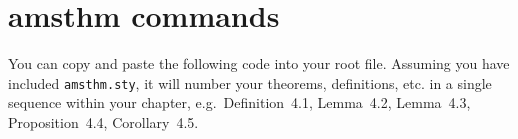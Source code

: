 
\chapter{amsthm commands}
\label{theorem}

You can copy and paste the following code into your root file.
Assuming you have included \verb"amsthm.sty", it will number your theorems,
definitions, etc. in a single sequence within your chapter,
e.g.~Definition~4.1, Lemma~4.2, Lemma~4.3, Proposition~4.4, Corollary~4.5.

\begin{smallverbatim} %
  \theoremstyle{plain}%
    \newtheorem{theorem}{Theorem}[chapter]
    \newtheorem{lemma}[theorem]{Lemma}
    \newtheorem{proposition}[theorem]{Proposition}
    \newtheorem{corollary}[theorem]{Corollary}
    \newtheorem{conjecture}[theorem]{Conjecture}

    \newtheorem*{theorem*}{Theorem}
    \newtheorem*{lemma*}{Lemma}
    \newtheorem*{proposition*}{Proposition}
    \newtheorem*{corollary*}{Corollary}
    \newtheorem*{conjecture*}{Conjecture}

  \theoremstyle{definition}
    \newtheorem{definition}[theorem]{Definition}
    \newtheorem{example}[theorem]{Example}
    \newtheorem{prob}[theorem]{Problem}
    \newtheorem{remark}[theorem]{Remark}
    \newtheorem{notation}[theorem]{Notation}
    \newtheorem{exer}[theorem]{Exercise}
    \newtheorem{criterion}[theorem]{Criterion}
    \newtheorem{algorithm}[theorem]{Algorithm}
    \newtheorem{claim}[theorem]{Claim}

    \newtheorem*{definition*}{Definition}
    \newtheorem*{example*}{Example}
    \newtheorem*{prob*}{Problem}
    \newtheorem*{remark*}{Remark}
    \newtheorem*{notation*}{Notation}
    \newtheorem*{exer*}{Exercise}
    \newtheorem*{criterion*}{Criterion}
    \newtheorem*{algorithm*}{Algorithm}
    \newtheorem*{claim*}{Claim}

    \newtheorem*{note}{Note}
    \newtheorem*{summary}{Summary}
    \newtheorem*{acknowledgement}{Acknowledgement}
    \newtheorem*{conclusion}{Conclusion}
\end{smallverbatim} %

\endinput